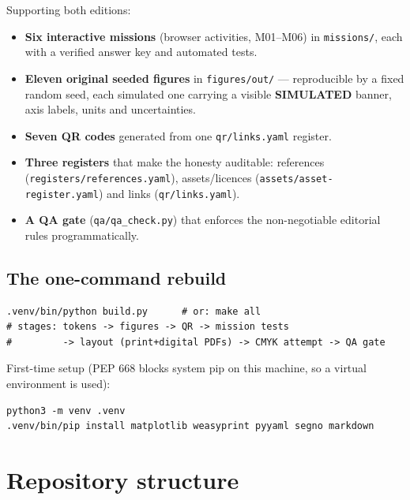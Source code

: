 \documentclass[11pt,a4paper]{article}
\newcommand{\code}[1]{\texttt{#1}}
\begin{document}
Supporting both editions:
\begin{itemize}[leftmargin=6mm,itemsep=1pt]
  \item \textbf{Six interactive missions} (browser activities, M01--M06) in
        \code{missions/}, each with a verified answer key and automated tests.
  \item \textbf{Eleven original seeded figures} in \code{figures/out/} ---
        reproducible by a fixed random seed, each simulated one carrying a
        visible \textbf{SIMULATED} banner, axis labels, units and uncertainties.
  \item \textbf{Seven QR codes} generated from one \code{qr/links.yaml} register.
  \item \textbf{Three registers} that make the honesty auditable: references
        (\code{registers/references.yaml}), assets/licences
        (\code{assets/asset-register.yaml}) and links (\code{qr/links.yaml}).
  \item \textbf{A QA gate} (\code{qa/qa\_check.py}) that enforces the
        non-negotiable editorial rules programmatically.
\end{itemize}

\subsection*{The one-command rebuild}
\begin{lstlisting}
.venv/bin/python build.py      # or: make all
# stages: tokens -> figures -> QR -> mission tests
#         -> layout (print+digital PDFs) -> CMYK attempt -> QA gate
\end{lstlisting}
First-time setup (PEP 668 blocks system pip on this machine, so a virtual
environment is used):
\begin{lstlisting}
python3 -m venv .venv
.venv/bin/pip install matplotlib weasyprint pyyaml segno markdown
\end{lstlisting}

\section{Repository structure}
\end{document}
